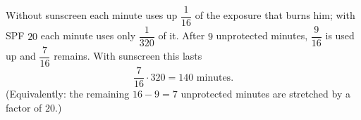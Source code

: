 Without sunscreen each minute uses up $\dfrac1{16}$ of the exposure that burns him; with SPF $20$ each minute uses only $\dfrac1{320}$ of it. After $9$ unprotected minutes, $\dfrac9{16}$ is used up and $\dfrac7{16}$ remains. With sunscreen this lasts
\[\dfrac{7}{16}\cdot320=\boxed{140}\text{ minutes}.\]
(Equivalently: the remaining $16-9=7$ unprotected minutes are stretched by a factor of $20$.)
